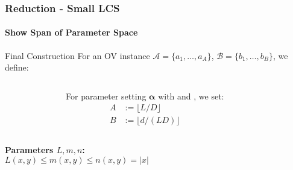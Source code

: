 \begin{frame}[t]
\frametitle{Reduction - Small LCS}
\framesubtitle{Show Span of Parameter Space}

\begin{exampleblock}{Final Construction}
For an OV instance $\mathcal{A} = \{a_1, \ldots, a_A\}$, $\mathcal{B} = \{b_1, \ldots, b_B\}$, we define:

\vspace{2ex}
\begin{columns}

\begin{figure}
	\centering
\end{figure}

For parameter setting $\mathbf{\alpha}$ with  and , we set:
\begin{align*}
	A &:= \lfloor L/D \rfloor \\
	B &:= \lfloor d/(LD) \rfloor
\end{align*}

\end{columns}
\end{exampleblock}

\pause


\begin{columns}
\setlength{\parskip}{1em}
\textbf{Parameters $L,m,n$:}\\
\vspace{1ex}
$L(x,y) \leq m(x,y) \leq n(x,y) = |x|$ 





\end{columns}
\end{frame}
